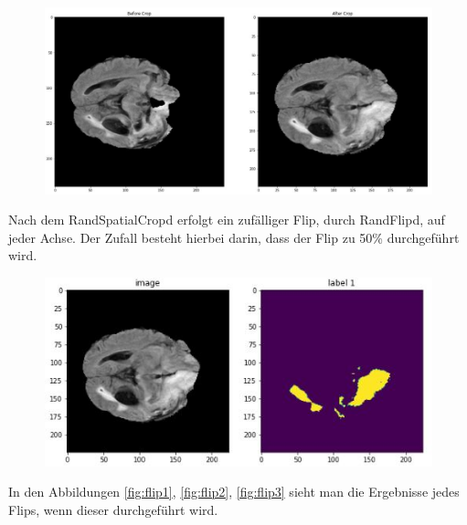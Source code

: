 \begin{figure}
\includegraphics[width=\linewidth]{./images/Crop.jpg}
\label{fig:crop}
\end{figure}

Nach dem RandSpatialCropd erfolgt ein zufälliger Flip, durch RandFlipd, auf jeder Achse. Der Zufall besteht hierbei darin, dass der Flip zu 50\% durchgeführt wird.

\begin{figure}[H]
\includegraphics[width=\linewidth]{./images/beforeFlip.jpg}
\label{fig:beforeFlip}
\end{figure}

In den Abbildungen \ref{fig:flip1}, \ref{fig:flip2}, \ref{fig:flip3} sieht man die Ergebnisse jedes Flips, wenn dieser durchgeführt wird.

